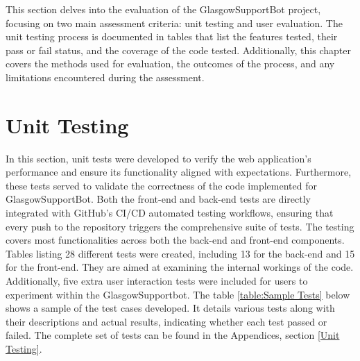 \documentclass{l4proj}
\begin{document}
This section delves into the evaluation of the GlasgowSupportBot project, focusing on two main assessment criteria: unit testing and user evaluation. The unit testing process is documented in tables that list the features tested, their pass or fail status, and the coverage of the code tested. Additionally, this chapter covers the methods used for evaluation, the outcomes of the process, and any limitations encountered during the assessment.

\section{Unit Testing}

In this section, unit tests were developed to verify the web application's performance and ensure its functionality aligned with expectations. Furthermore, these tests served to validate the correctness of the code implemented for GlasgowSupportBot. Both the front-end and back-end tests are directly integrated with GitHub's CI/CD automated testing workflows, ensuring that every push to the repository triggers the comprehensive suite of tests. The testing covers most functionalities across both the back-end and front-end components. Tables listing 28 different tests were created, including 13 for the back-end and 15 for the front-end. They are aimed at examining the internal workings of the code. Additionally, five extra user interaction tests were included for users to experiment within the GlasgowSupportbot. The table \ref{table:Sample Tests} below shows a sample of the test cases developed. It details various tests along with their descriptions and actual results, indicating whether each test passed or failed. The complete set of tests can be found in the Appendices, section \ref{Unit Testing}.
\end{document}
